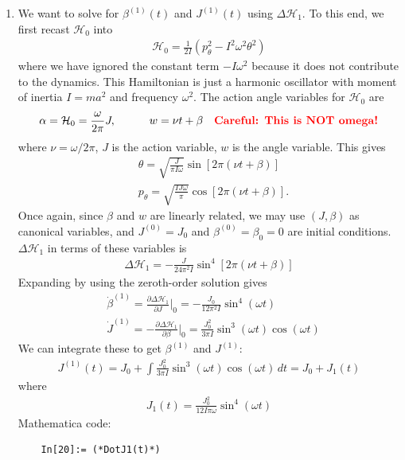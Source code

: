 \documentclass{article}
\theoremstyle{definition}
\newcommand{\p}{\partial}
\newcommand{\ham}{\mathcal{H}}
\newcommand{\al}{\alpha}
\newcommand{\be}{\beta}
\newcommand{\f}[2]{\frac{#1}{#2}}
\newcommand{\lp}{\left(}
\newcommand{\rp}{\right)}
\begin{document}
\begin{enumerate}[label=(\alph*)]
	
	\item We want to solve for $\be^{(1)}(t)$ and $J^{(1)}(t)$ using $\Delta \ham_1$. To this end, we first recast $\ham_0$ into 
	\begin{align*}
	\ham_0 = \f{1}{2I}\lp p_\theta^2 - I^2 \omega^2 \theta^2 \rp
	\end{align*}
	where we have ignored the constant term $-I\omega^2$ because it does not contribute to the dynamics.  This Hamiltonian is just a harmonic oscillator with moment of inertia $I = ma^2$ and frequency $\omega^2$. The action angle variables for $\ham_0$ are
	\begin{align*}
	\al = \ham_0 = \f{\omega}{2\pi} J ,\quad\quad\quad w = \nu t + \be\quad\text{\textbf{\textcolor{red}{Careful: This is NOT omega!}}}
	\end{align*}
	where $\nu = \omega/2\pi$, $J$ is the action variable, $w$ is the angle variable. This gives
	\begin{align*}
	&\theta = \sqrt{\f{J}{\pi I \omega}} \sin[2\pi(\nu t + \be)] \\
	&p_\theta = \sqrt{\f{IJ\omega}{\pi}} \cos[2\pi(\nu t + \be)].
	\end{align*} 
	Once again, since $\be$ and $w$ are linearly related, we may use $(J,\be)$ as canonical variables, and $J^{(0)} = J_0$ and $\be^{(0)} = \be_0 = 0$ are initial conditions. $\Delta \ham_1$ in terms of these variables is
	\begin{align*}
	\Delta \ham_1 = -\f{J}{24\pi^2 I } \sin^4[2\pi(\nu t + \be)]
	\end{align*}
	Expanding by using the zeroth-order solution gives
	\begin{align*}
	&\dot \be^{(1)} = \f{\p \Delta \ham_1}{\p J}\bigg\vert_0 = {- \f{J_0}{12\pi^2 I } \sin^4(\omega t)}\\
	&\dot J^{(1)} = -\f{\p \Delta \ham_1}{\p \be} \bigg\vert_0 = {\f{J_0^2}{3\pi I} \sin^3(\omega t)\cos(\omega t)  }
	\end{align*}
	We can integrate these to get $\be^{(1)}$ and $J^{(1)}$:
	\begin{align*}
	J^{(1)}(t) = J_0 + \int \f{J_0^2}{3\pi I} \sin^3(\omega t)\cos(\omega t) \,dt = \boxed{J_0 + J_1(t)}
	\end{align*}
	where
	\begin{align*}
	\boxed{J_1(t) = \f{J_0^2}{12 I \pi \omega} \sin^4 (\omega t)}
	\end{align*}
	Mathematica code:
	\begin{lstlisting}
	In[20]:= (*DotJ1(t)*)
	

\end{lstlisting}
\end{enumerate}
\end{document}
